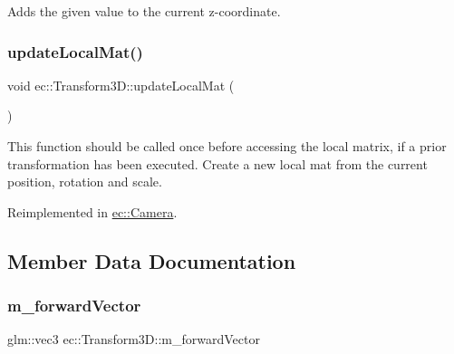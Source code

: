 Adds the given value to the current z-\/coordinate. \mbox{\label{classec_1_1_transform3_d_a68d259da063ea2aff48720ae55870445}} 
\subsubsection{\texorpdfstring{update\+Local\+Mat()}{updateLocalMat()}}
{\footnotesize\ttfamily void ec\+::\+Transform3\+D\+::update\+Local\+Mat (\begin{DoxyParamCaption}{ }\end{DoxyParamCaption})\hspace{0.3cm}{\ttfamily [virtual]}}

This function should be called once before accessing the local matrix, if a prior transformation has been executed. Create a new local mat from the current position, rotation and scale. 

Reimplemented in \mbox{\hyperlink{classec_1_1_camera_acff95ac4ca039715d67c83111d03b8c1}{ec\+::\+Camera}}.



\subsection{Member Data Documentation}
\mbox{\label{classec_1_1_transform3_d_a5d7ebb5dc842dc73fe0840f3e3f95ab8}} 
\subsubsection{\texorpdfstring{m\+\_\+forward\+Vector}{m\_forwardVector}}
{\footnotesize\ttfamily glm\+::vec3 ec\+::\+Transform3\+D\+::m\+\_\+forward\+Vector\hspace{0.3cm}{\ttfamily [protected]}}

\mbox{\label{classec_1_1_transform3_d_a5bba8c29bb22d2b122b64b51b52335f7}} 
